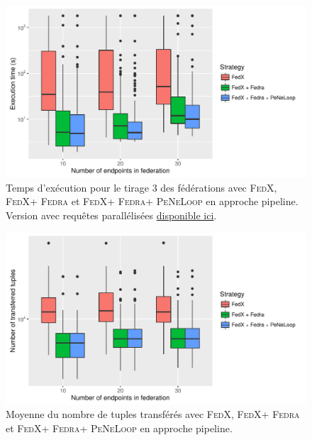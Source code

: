 \documentclass[a4paper]{article}
\def\fedra{\textsc{Fedra}\xspace}
\def\fedx{\textsc{FedX}\xspace}
\def\peneloop{\textsc{PeNeLoop}\xspace}
\newcommand{\parallelLink}[1]{Version avec requêtes parallélisées \href{#1}{disponible ici}.}
\begin{document}
\begin{figure}[h]
    \centering
    \includegraphics{boxplots/fed3_execution_time.pdf}
    \caption{Temps d'exécution pour le tirage 3 des fédérations avec \fedx, \fedx + \fedra et \fedx + \fedra + \peneloop en approche pipeline. \parallelLink{https://github.com/Callidon/ParallelNestedLoop/blob/master/results/definitive/fed3_pll_execution_time.pdf}}
    \label{fig:fed3_time}
\end{figure}

\begin{figure}[h]
    \centering
    \includegraphics{boxplots/avg_transferred_tuples.pdf}
    \caption{Moyenne du nombre de tuples transférés avec \fedx, \fedx + \fedra et \fedx + \fedra + \peneloop en approche pipeline.}
    \label{fig:avg_tuples}
\end{figure}
\end{document}
